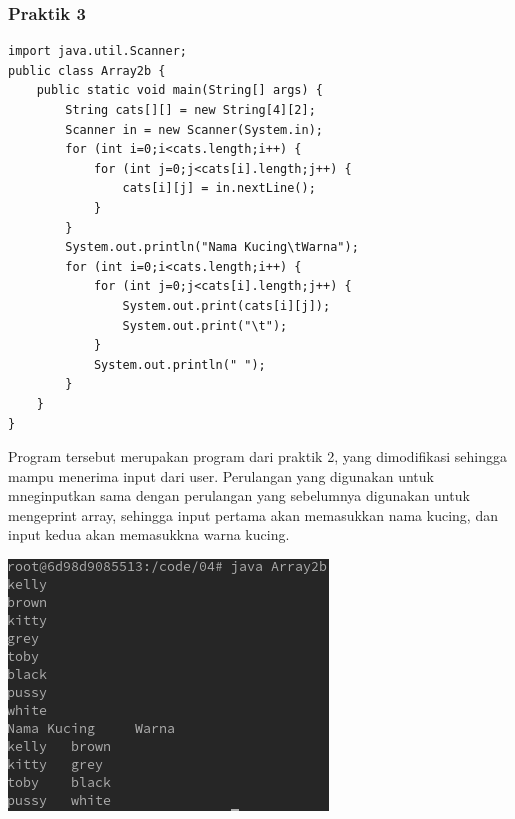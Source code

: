 \documentclass[a4paper,12pt]{article}
\begin{document}
\subsubsection{Praktik 3}
\begin{lstlisting}
import java.util.Scanner;
public class Array2b {
    public static void main(String[] args) {
        String cats[][] = new String[4][2];
        Scanner in = new Scanner(System.in);
        for (int i=0;i<cats.length;i++) {
            for (int j=0;j<cats[i].length;j++) {
                cats[i][j] = in.nextLine();
            }
        }
        System.out.println("Nama Kucing\tWarna");
        for (int i=0;i<cats.length;i++) {
            for (int j=0;j<cats[i].length;j++) {
                System.out.print(cats[i][j]);
                System.out.print("\t");
            }
            System.out.println(" ");
        }
    }
}
\end{lstlisting}
Program tersebut merupakan program dari praktik 2, yang dimodifikasi sehingga mampu menerima input dari user. Perulangan yang digunakan untuk mneginputkan
sama dengan perulangan yang sebelumnya digunakan untuk mengeprint array, sehingga input pertama akan memasukkan nama kucing, dan 
input kedua akan memasukkna warna kucing.
\begin{center}
    \includegraphics{3.png}
\end{center}
\end{document}
